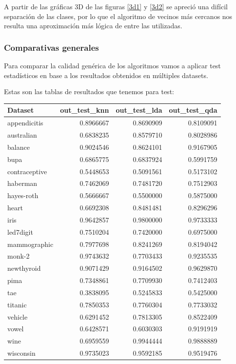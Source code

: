 A partir de las gráficas 3D de las figuras \ref{3d1} y \ref{3d2} se apreció una difícil separación de las clases, por lo que el algoritmo de vecinos más cercanos nos resulta una aproximación más lógica de entre las utilizadas.

\newpage

\subsubsection{Comparativas generales}

Para comparar la calidad genérica de los algoritmos vamos a aplicar test estadísticos en base a los resultados obtenidos en múltiples datasets.

\vspace{\baselineskip}

Estas son las tablas de resultados que tenemos para test:

\vspace{\baselineskip}

\begin{tabular}{l|r|r|r}
\hline
Dataset & out\_test\_knn & out\_test\_lda & out\_test\_qda\\
\hline
appendicitis & 0.8966667 & 0.8690909 & 0.8109091\\
\hline
australian & 0.6838235 & 0.8579710 & 0.8028986\\
\hline
balance & 0.9024546 & 0.8624101 & 0.9167905\\
\hline
bupa & 0.6865775 & 0.6837924 & 0.5991759\\
\hline
contraceptive & 0.5448653 & 0.5091561 & 0.5173102\\
\hline
haberman & 0.7462069 & 0.7481720 & 0.7512903\\
\hline
hayes-roth & 0.5666667 & 0.5500000 & 0.5875000\\
\hline
heart & 0.6692308 & 0.8481481 & 0.8296296\\
\hline
iris & 0.9642857 & 0.9800000 & 0.9733333\\
\hline
led7digit & 0.7510204 & 0.7420000 & 0.6975000\\
\hline
mammographic & 0.7977698 & 0.8241269 & 0.8194042\\
\hline
monk-2 & 0.9743632 & 0.7703433 & 0.9235535\\
\hline
newthyroid & 0.9071429 & 0.9164502 & 0.9629870\\
\hline
pima & 0.7348861 & 0.7709930 & 0.7412403\\
\hline
tae & 0.3838095 & 0.5245833 & 0.5425000\\
\hline
titanic & 0.7850353 & 0.7760304 & 0.7733032\\
\hline
vehicle & 0.6291452 & 0.7813305 & 0.8522409\\
\hline
vowel & 0.6428571 & 0.6030303 & 0.9191919\\
\hline
wine & 0.6959559 & 0.9944444 & 0.9888889\\
\hline
wisconsin & 0.9735023 & 0.9592185 & 0.9519476\\
\hline
\end{tabular}

